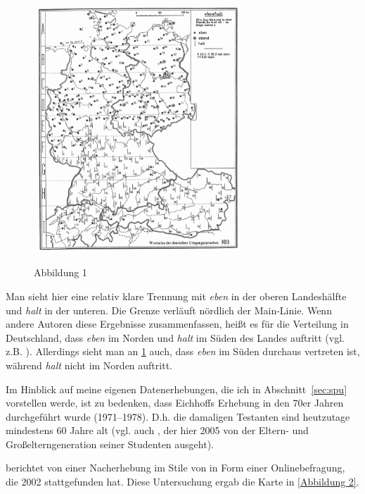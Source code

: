 \begin{figure}[h]
\includegraphics[width=0.7\textwidth]{he1.png}
\caption{Abbildung 1}
\label{Abbildung 1}
\hbox{}\hfill\hbox{\citet[103]{Eichhoff1978}}
\end{figure}	
\noindent
Man sieht hier eine relativ klare Trennung mit \textit{eben} in der oberen Landeshälfte und \textit{halt} in der unteren. Die Grenze verläuft nördlich der Main-Linie. Wenn andere Autoren diese Ergebnisse zusammenfassen, heißt es für die Verteilung in Deutschland, dass \textit{eben} im Norden und \textit{halt} im Süden des Landes auftritt (vgl. z.B. \citealt[212]{Dittmar2000}). Allerdings sieht man an \ref{Abbildung 1} auch, dass \textit{eben} im Süden durchaus vertreten ist, während \textit{halt} nicht im Norden auftritt.

Im Hinblick auf meine eigenen Datenerhebungen, die ich in Abschnitt~\ref{sec:spu} vorstellen werde, ist zu bedenken, dass Eichhoffs Erhebung in den 70er Jahren durchgeführt wurde (1971–1978). D.h. die damaligen Testanten sind heutzutage mindestens 60 Jahre alt (vgl. auch \citealt[2]{Elspass2005}, der hier 2005 von der Eltern- und Großelterngeneration seiner Studenten ausgeht). 

\citet{Elspass2005} berichtet von einer Nacherhebung im Stile von \citet{Eichhoff1978} in Form einer Onlinebefragung, die 2002 stattgefunden hat. Diese Untersuchung ergab die Karte in \ref{Abbildung 2}.

